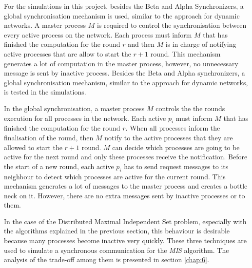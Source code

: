 For the simulations in this project, besides the Beta and Alpha Synchronizers, a global synchronisation mechanism is used, similar to the approach for dynamic networks. A master process $M$ is required to control the synchronisation between every active process on the network.  Each process must inform $M$ that has finished the computation for the round $r$ and then $M$ is in charge of notifying active processes that are allow to start the $r + 1$ round. This mechanism generates a lot of computation in the master process, however, no unnecessary message is sent by inactive process. Besides the Beta and Alpha synchronizers, a global synchronisation mechanism, similar to the approach for dynamic networks, is tested in the simulations. 

In the global synchronisation, a master process $M$ controls the the rounds execution for all processes in the network. Each active $p_i$ must inform $M$ that has finished the computation for the round $r$. When all processes inform the finalisation of the round, then $M$  notify to the active processes that they are allowed to start the $r + 1$ round. $M$ can decide which processes are going to be active for the next round and only these processes receive the notification. Before the start of a new round, each active $p_i$ has to send request messages to its neighbour to detect which processes are active for the current round. This mechanism generates a lot of messages to the master process and creates a bottle neck on it. However, there are no extra messages sent by inactive processes or to them.   

In the case of the Distributed Maximal Independent Set problem, especially with the algorithms explained in the previous section, this behaviour is desirable because many processes become inactive very quickly. These three techniques are used to simulate a synchronous communication for the \textit{MIS} algorithm. The analysis of the trade-off among them is presented in section \ref{chap:6}.




